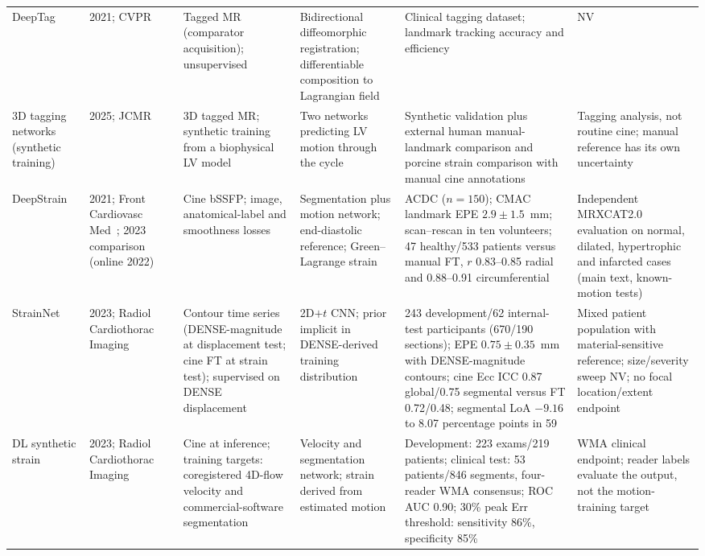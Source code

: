 \documentclass[11pt,a4paper]{article}
\begin{document}
{\begin{longtable}{L{0.107\textwidth}L{0.111\textwidth}L{0.155\textwidth}L{0.179\textwidth}L{0.199\textwidth}L{0.16\textwidth}}
\addlinespace
DeepTag & 2021; CVPR~\cite{ye2021deeptag} & Tagged MR (comparator acquisition); unsupervised & Bidirectional diffeomorphic registration; differentiable composition to Lagrangian field & Clinical tagging dataset; landmark tracking accuracy and efficiency & NV \\
\addlinespace
3D tagging networks (synthetic training) & 2025; JCMR~\cite{buoso2025tagging3d} & 3D tagged MR; synthetic training from a biophysical LV model & Two networks predicting LV motion through the cycle & Synthetic validation plus external human manual-landmark comparison and porcine strain comparison with manual cine annotations & Tagging analysis, not routine cine; manual reference has its own uncertainty \\
\addlinespace
DeepStrain & 2021; Front Cardiovasc Med~\cite{morales2021}; 2023 com\-parison (online 2022)~\cite{morales2022comparison} & Cine bSSFP; image, anatomical-label and smoothness losses & Segmentation plus motion network; end-diastolic reference; Green--Lagrange strain & ACDC (\(n=150\)); CMAC landmark EPE \(2.9\pm1.5\)~mm; scan--rescan in ten volunteers; 47 healthy/533 patients versus manual FT, \(r\) 0.83--0.85 radial and 0.88--0.91 circumferential & Independent MRXCAT2.0 evaluation on normal, dilated, hypertrophic and infarcted cases (main text, known-motion tests) \\
\addlinespace
StrainNet & 2023; Radiol Cardiothorac Imaging~\cite{wang2023strainnet} & Contour time series (DENSE-magnitude at displacement test; cine FT at strain test); supervised on DENSE displacement & 2D\(+t\) CNN; prior implicit in DENSE-derived training distribution & 243 development/62 internal-test participants (670/190 sections); EPE \(0.75\pm0.35\)~mm with DENSE-magnitude contours; cine Ecc ICC 0.87 global/0.75 segmental versus FT 0.72/0.48; segmental LoA \(-9.16\) to 8.07 percentage points in 59 & Mixed patient population with material-sensitive reference; size/severity sweep NV; no focal location/extent endpoint \\
\addlinespace
DL synthetic strain & 2023; Radiol Cardiothorac Imaging~\cite{masutani2023dlss} & Cine at inference; training targets: coregistered 4D-flow velocity and commercial-software segmentation & Velocity and segmentation network; strain derived from estimated motion & Development: 223 exams/219 patients; clinical test: 53 patients/846 segments, four-reader WMA consensus; ROC AUC 0.90; 30\% peak Err threshold: sensitivity 86\%, specificity 85\% & WMA clinical endpoint; reader labels evaluate the output, not the motion-training target \\

\end{longtable}}
\end{document}
